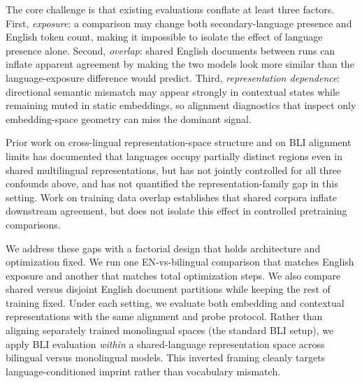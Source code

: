 \documentclass[11pt]{article}
\begin{document}
The core challenge is that existing evaluations conflate at least three factors. First, \emph{exposure}: a comparison may change both secondary-language presence and English token count, making it impossible to isolate the effect of language presence alone. Second, \emph{overlap}: shared English documents between runs can inflate apparent agreement by making the two models look more similar than the language-exposure difference would predict. Third, \emph{representation dependence}: directional semantic mismatch may appear strongly in contextual states while remaining muted in static embeddings, so alignment diagnostics that inspect only embedding-space geometry can miss the dominant signal.

Prior work on cross-lingual representation-space structure \citep{pires2019multilingual,libovicky2020language,chi2020finding} and on BLI alignment limits \citep{vulic2020we,sogaard2018limitations} has documented that languages occupy partially distinct regions even in shared multilingual representations, but has not jointly controlled for all three confounds above, and has not quantified the representation-family gap in this setting. Work on training data overlap \citep{dodge2021documenting,lee2022deduplicating} establishes that shared corpora inflate downstream agreement, but does not isolate this effect in controlled pretraining comparisons.

We address these gaps with a factorial design that holds architecture and optimization fixed. We run one EN-vs-bilingual comparison that matches English exposure and another that matches total optimization steps. We also compare shared versus disjoint English document partitions while keeping the rest of training fixed. Under each setting, we evaluate both embedding and contextual representations with the same alignment and probe protocol. Rather than aligning separately trained monolingual spaces (the standard BLI setup), we apply BLI evaluation \emph{within} a shared-language representation space across bilingual versus monolingual models. This inverted framing cleanly targets language-conditioned imprint rather than vocabulary mismatch.
\end{document}
